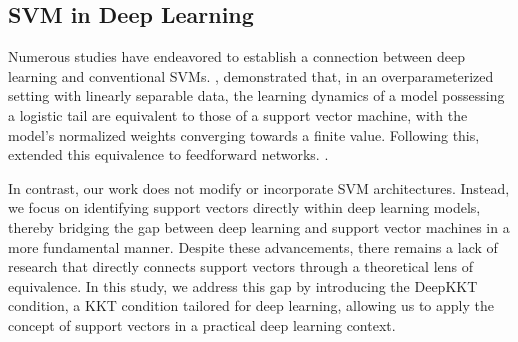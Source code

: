 \subsection{SVM in Deep Learning}
Numerous studies have endeavored to establish a connection between deep learning and conventional SVMs. 
, \cite{svm:theory} demonstrated that, in an overparameterized setting with linearly separable data, the learning dynamics of a model possessing a logistic tail are equivalent to those of a support vector machine, with the model’s normalized weights converging towards a finite value. Following this, \cite{svmhomo} extended this equivalence to feedforward networks. 
 \cite{svmpractical, svmpractical2, SVMex1,SVMex2,SVMEX3}. 

In contrast, our work does not modify or incorporate SVM architectures. Instead, we focus on identifying support vectors directly within deep learning models, thereby bridging the gap between deep learning and support vector machines in a more fundamental manner. Despite these advancements, there remains a lack of research that directly connects support vectors through a theoretical lens of equivalence. In this study, we address this gap by introducing the DeepKKT condition, a KKT condition tailored for deep learning, allowing us to apply the concept of support vectors in a practical deep learning context.

